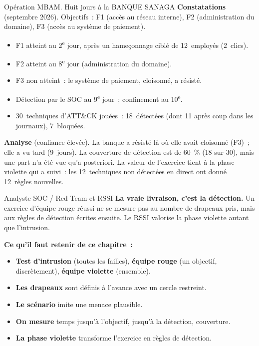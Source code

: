 \begin{boxscenario}{Opération MBAM. Huit jours à la BANQUE SANAGA}
\textbf{Constatations} (septembre 2026). Objectifs~: F1 (accès au réseau
interne), F2 (administration du domaine), F3 (accès au système de paiement).
\begin{itemize}
    \item F1 atteint au 2\textsuperscript{e} jour, après un hameçonnage ciblé de
          12~employés (2~clics).
    \item F2 atteint au 8\textsuperscript{e} jour (administration du domaine).
    \item F3 non atteint~: le système de paiement, cloisonné, a résisté.
    \item Détection par le SOC au 9\textsuperscript{e} jour~; confinement au 10\textsuperscript{e}.
    \item 30~techniques d'ATT\&CK jouées~: 18~détectées (dont 11 après coup
          dans les journaux), 7~bloquées.
\end{itemize}

\medskip
\textbf{Analyse} (confiance élevée). La banque a résisté là où elle avait
cloisonné (F3)~; elle a vu tard (9~jours). La couverture de détection est de
60~\% (18 sur 30), mais une part n'a été vue qu'a posteriori. La valeur de
l'exercice tient à la phase violette qui a suivi~: les 12~techniques non
détectées en direct ont donné 12~règles nouvelles.
\end{boxscenario}

\begin{boxmetier}{Analyste SOC / Red Team et RSSI}
\textbf{La vraie livraison, c'est la détection.} Un exercice d'équipe rouge
réussi ne se mesure pas au nombre de drapeaux pris, mais aux règles de
détection écrites ensuite. Le RSSI valorise la phase violette autant que
l'intrusion.
\end{boxmetier}

\separateur

\begin{boxresume}
\textbf{Ce qu'il faut retenir de ce chapitre~:}
\begin{itemize}
    \item \textbf{Test d'intrusion} (toutes les failles), \textbf{équipe
          rouge} (un objectif, discrètement), \textbf{équipe violette}
          (ensemble).
    \item \textbf{Les drapeaux} sont définis à l'avance avec un cercle
          restreint.
    \item \textbf{Le scénario} imite une menace plausible.
    \item \textbf{On mesure} temps jusqu'à l'objectif, jusqu'à la détection,
          couverture.
    \item \textbf{La phase violette} transforme l'exercice en règles de
          détection.
\end{itemize}
\end{boxresume}

